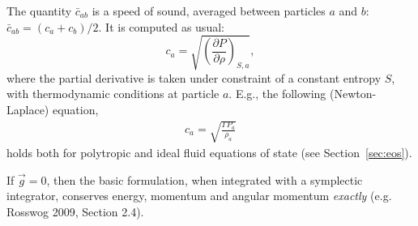 \documentclass[notes.tex]{subfiles}
\begin{document}
The quantity $\bar{c}_{ab}$ is a speed of sound, averaged between particles
$a$ and $b$: $\bar{c}_{ab} = (c_a + c_b)/2$. It is computed as usual:
\begin{equation}
c_a = \sqrt{\left(\frac{\partial P}{\partial \rho}\right)_{S,a}},
\end{equation}
where the partial derivative is taken under constraint of a constant entropy
$S$, with thermodynamic conditions at particle $a$.
E.g., the following (Newton-Laplace) equation,
\begin{align}
  c_a = \sqrt{\frac{\Gamma P_a}{\rho_a}}
\end{align}
holds both for polytropic and ideal fluid equations of state (see
Section~\ref{sec:eos}).

If $\vec{g}=0$, then the basic formulation, when integrated with a symplectic
integrator, conserves energy, momentum and angular momentum \emph{exactly}
(e.g. Rosswog 2009, Section 2.4).
\end{document}
